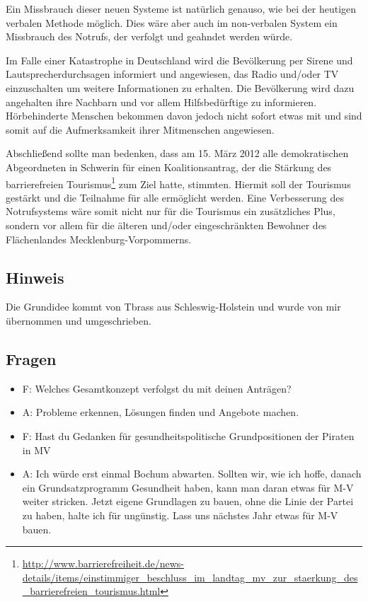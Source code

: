 Ein Missbrauch dieser neuen Systeme ist natürlich genauso, wie bei der heutigen verbalen Methode möglich. Dies wäre aber auch im non-verbalen System ein Missbrauch des Notrufs, der verfolgt und geahndet werden würde.

Im Falle einer Katastrophe in Deutschland wird die Bevölkerung per Sirene und Lautsprecherdurchsagen informiert und angewiesen, das Radio und/oder TV einzuschalten um weitere Informationen zu erhalten. Die Bevölkerung wird dazu angehalten ihre Nachbarn und vor allem Hilfsbedürftige zu informieren. Hörbehinderte Menschen bekommen davon jedoch nicht sofort etwas mit und sind somit auf die Aufmerksamkeit ihrer Mitmenschen angewiesen.

Abschließend sollte man bedenken, dass am 15. März 2012 alle demokratischen Abgeordneten in Schwerin für einen Koalitionsantrag, der die Stärkung des barrierefreien Tourismus\footnote{\url{http://www.barrierefreiheit.de/news-details/items/einstimmiger\_beschluss\_im\_landtag\_mv\_zur\_staerkung\_des\_barrierefreien\_tourismus.html}} zum Ziel hatte, stimmten. Hiermit soll der Tourismus gestärkt und die Teilnahme für alle ermöglicht werden. Eine Verbesserung des Notrufsystems wäre somit nicht nur für die Tourismus ein zusätzliches Plus, sondern vor allem für die älteren und/oder eingeschränkten Bewohner des Flächenlandes Mecklenburg-Vorpommerns.

\subsection{Hinweis}

Die Grundidee kommt von Tbrass aus Schleswig-Holstein und wurde von mir übernommen und umgeschrieben.

\subsection{Fragen}

\begin{itemize}
\item
  F: Welches Gesamtkonzept verfolgst du mit deinen Anträgen?
\item
  A: Probleme erkennen, Lösungen finden und Angebote machen.
\end{itemize}
\begin{itemize}
\item
  F: Hast du Gedanken für gesundheitspolitische Grundpositionen der Piraten in MV
\item
  A: Ich würde erst einmal Bochum abwarten. Sollten wir, wie ich hoffe, danach ein Grundsatzprogramm Gesundheit haben, kann man daran etwas für M-V weiter stricken. Jetzt eigene Grundlagen zu bauen, ohne die Linie der Partei zu haben, halte ich für ungünstig. Lass uns nächstes Jahr etwas für M-V bauen.
\end{itemize}
